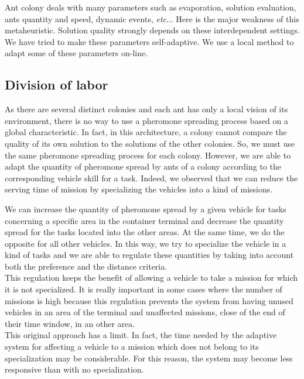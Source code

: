 \documentclass[journal]{IEEEtran}
\begin{document}
Ant colony deals with many parameters such as evaporation, solution evaluation, ants quantity and speed,
dynamic events, \textit{etc}... Here is the major weakness of this metaheuristic. Solution quality strongly depends on these interdependent settings. %
We have tried to make these parameters self-adaptive. We use a local method to adapt some of these parameters on-line.

\subsection{Division of labor}
As there are several distinct colonies and each ant has only a local vision of its environment, there
is no way to use a pheromone spreading process based on a global characteristic.
In fact, in this architecture, a colony cannot compare the quality of its own
solution to the solutions of the other colonies. So, we must use the same
pheromone spreading process for each colony. However, we are able to adapt the
quantity of pheromone spread by ants of a colony according to the corresponding
vehicle skill for a task. Indeed, we observed that we can reduce the
serving time of mission by specializing the vehicles into a kind of missions.

We can increase the quantity of pheromone spread by
a given vehicle for tasks concerning a specific area in the
container terminal and decrease the quantity spread for the tasks located into
the other areas. At the same time, we do the opposite for all other vehicles. In this way, we try to specialize the vehicle in a kind of
tasks and we are able to regulate these quantities by taking into account both
the preference and the distance criteria.\\

This regulation keeps the benefit of allowing a vehicle to take a
mission for which it is not specialized. It is really important in some cases
where the number of missions is high because this regulation prevents the system
from having unused vehicles in an area of the terminal and unaffected missions,
close of the end of their time window, in an other area.\\

This original approach has a limit. In fact, the time needed by the adaptive
system for affecting a vehicle to a mission which does not belong to its
specialization may be considerable. For this reason, the system may become less
responsive than with no specialization.
\end{document}
